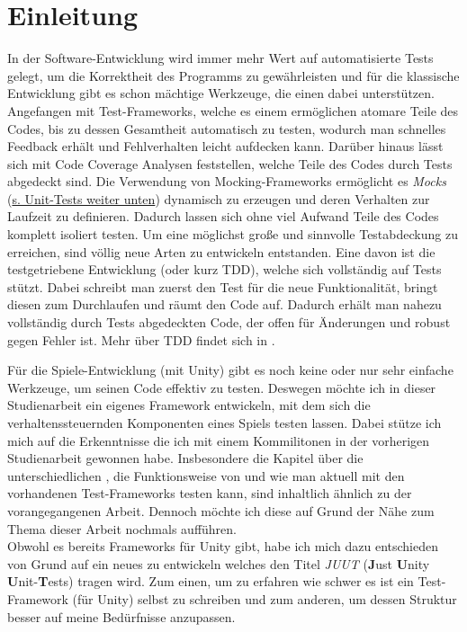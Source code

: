 \chapter{Einleitung}
\label{sec:Einleitung}

In der Software-Entwicklung wird immer mehr Wert auf automatisierte Tests gelegt, um die Korrektheit des Programms zu gewährleisten und für die klassische Entwicklung gibt es schon mächtige Werkzeuge, die einen dabei unterstützen. Angefangen mit Test-Frameworks, welche es einem ermöglichen atomare Teile des Codes, bis zu dessen Gesamtheit automatisch zu testen, wodurch man schnelles Feedback erhält und Fehlverhalten leicht aufdecken kann. Darüber hinaus lässt sich mit Code Coverage Analysen feststellen, welche Teile des Codes durch Tests abgedeckt sind. Die Verwendung von Mocking-Frameworks ermöglicht es \textit{Mocks} (\hyperlink{DefinitionMock}{s. Unit-Tests weiter unten}) dynamisch zu erzeugen und deren Verhalten zur Laufzeit zu definieren. Dadurch lassen sich ohne viel Aufwand Teile des Codes komplett isoliert testen. Um eine möglichst große und sinnvolle Testabdeckung zu erreichen, sind völlig neue Arten zu entwickeln entstanden. Eine davon ist die testgetriebene Entwicklung (oder kurz TDD), welche sich vollständig auf Tests stützt. Dabei schreibt man zuerst den Test für die neue Funktionalität, bringt diesen zum Durchlaufen und räumt den Code auf. Dadurch erhält man nahezu vollständig durch Tests abgedeckten Code, der offen für Änderungen und robust gegen Fehler ist. Mehr über TDD findet sich in \cite{FRE10}.

Für die Spiele-Entwicklung (mit Unity) gibt es noch keine oder nur sehr einfache Werkzeuge, um seinen Code effektiv zu testen. Deswegen möchte ich in dieser Studienarbeit ein eigenes Framework entwickeln, mit dem sich die verhaltenssteuernden Komponenten eines Spiels testen lassen. Dabei stütze ich mich auf die Erkenntnisse die ich mit einem Kommilitonen in der vorherigen Studienarbeit \cite{TDGD13} gewonnen habe. Insbesondere die Kapitel über die unterschiedlichen , die Funktionsweise von  und wie man aktuell  mit den vorhandenen Test-Frameworks testen kann, sind inhaltlich ähnlich zu der vorangegangenen Arbeit. Dennoch möchte ich diese auf Grund der Nähe zum Thema dieser Arbeit nochmals aufführen.\\
Obwohl es bereits Frameworks für Unity gibt, habe ich mich dazu entschieden von Grund auf ein neues zu entwickeln welches den Titel \textit{JUUT} (\textbf{J}ust \textbf{U}nity \textbf{U}nit-\textbf{T}ests) tragen wird. Zum einen, um zu erfahren wie schwer es ist ein Test-Framework (für Unity) selbst zu schreiben und zum anderen, um dessen Struktur besser auf meine Bedürfnisse anzupassen.

